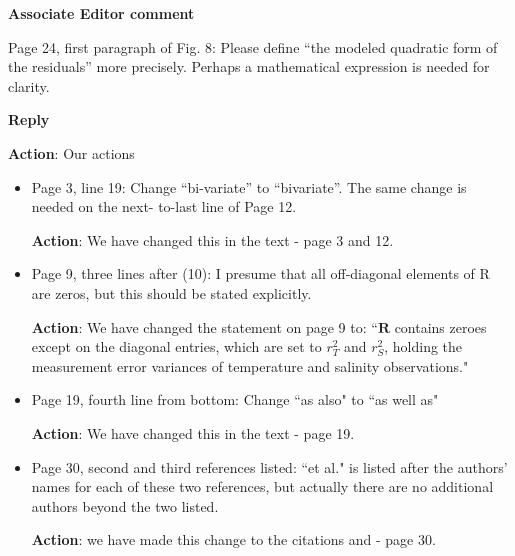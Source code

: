 \documentclass[a4paper]{article}
\newcommand{\bR}{ {\boldsymbol R} }
\def\aecom{\textbf{Associate Editor comment}}
\def\reply{\textbf{Reply}}
\def\action{\textbf{Action}}
\begin{document}
\vspace{5mm}
\noindent \aecom 

Page 24, first paragraph of Fig. 8: Please define “the modeled quadratic form of the residuals” more precisely. Perhaps a mathematical expression is needed for clarity.\par

\reply 

\action: Our actions
\vspace{1em}




\vspace{5mm}
\begin{itemize}[noitemsep,topsep=0pt,parsep=0pt,partopsep=0pt]

\item Page 3, line 19: Change “bi-variate” to “bivariate”. The same change is needed on the next-
to-last line of Page 12.

\action: We have changed this in the text - page 3 and 12.

\item Page 9, three lines after (10): I presume that all off-diagonal elements of R are zeros, but this
should be stated explicitly.

\action: We have changed the statement on page 9 to: ``$\bR$ contains zeroes except on the diagonal entries, which are set to $r^2_T$ and $r^2_S$, holding the measurement error variances of temperature and salinity observations."

\item Page 19, fourth line from bottom: Change ``as also" to ``as well as"

\action: We have changed this in the text - page 19.

\item Page 30, second and third references listed: ``et al." is listed after the authors’ names for each
of these two references, but actually there are no additional authors beyond the two listed.

\action: we have made this change to the citations \cite{genton2015cross} and \cite{french2016credible} - page 30.
\end{itemize}
\end{document}
